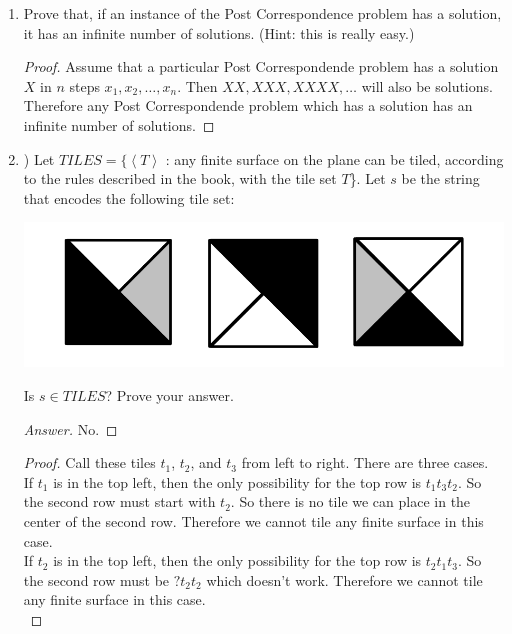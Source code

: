 \documentclass[10pt]{article}
\newcommand{\brackets}[1]{\left< #1 \right>}
\begin{document}
\begin{enumerate}[1)]
\item
Prove that, if an instance of the Post Correspondence problem has a solution, it has an infinite number of solutions. (Hint: this is really easy.)
\begin{proof}[Proof]
Assume that a particular Post Correspondende problem has a solution $X$ in $n$ steps $x_1, x_2, \dots , x_n$.  Then $XX, XXX, XXXX, \dots$ will also be solutions.  Therefore any Post Correspondende problem which has a solution has an infinite number of solutions.
\end{proof}

\pagebreak

\item
) Let $TILES = \{\brackets{T}$ : any finite surface on the plane can be tiled, according to the rules described in the book, with the tile set $T$\}.  Let $s$ be the string that encodes the following tile set:\\

\begin{center}
\includegraphics[scale=.2]{images/tiles.png}
\end{center}
Is $s \in TILES$?  Prove your answer.
\begin{proof}[Answer]
No.
\end{proof}
\begin{proof}[Proof]
Call these tiles $t_1$, $t_2$, and $t_3$ from left to right.  There are three cases.\\

If $t_1$ is in the top left, then the only possibility for the top row is $t_1t_3t_2$.  So the second row must start with $t_2$.  So there is no tile we can place in the center of the second row.  Therefore we cannot tile any finite surface in this case.\\

If $t_2$ is in the top left, then the only possibility for the top row is $t_2t_1t_3$.  So the second row must be $?t_2t_2$ which doesn't work.  Therefore we cannot tile any finite surface in this case.\\


\end{proof}
\end{enumerate}
\end{document}
